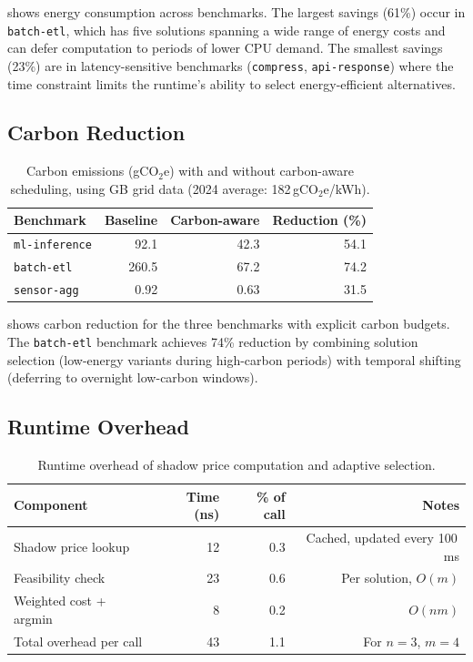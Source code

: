 \documentclass[11pt,a4paper]{article}
\begin{document}
 shows energy consumption across benchmarks.  The largest
savings (61\%) occur in \texttt{batch-etl}, which has five solutions spanning
a wide range of energy costs and can defer computation to periods of lower CPU
demand.  The smallest savings (23\%) are in latency-sensitive benchmarks
(\texttt{compress}, \texttt{api-response}) where the time constraint limits
the runtime's ability to select energy-efficient alternatives.

\subsection{Carbon Reduction}

\begin{table}[t]
\centering
\caption{Carbon emissions (gCO$_2$e) with and without carbon-aware scheduling,
using GB grid data (2024 average: 182\,gCO$_2$e/kWh).}
\label{tab:carbon}
\begin{tabular}{lrrr}
\toprule
Benchmark & Baseline & Carbon-aware & Reduction (\%) \\
\midrule
\texttt{ml-inference} & 92.1 & 42.3 & 54.1 \\
\texttt{batch-etl}    & 260.5 & 67.2 & 74.2 \\
\texttt{sensor-agg}   & 0.92 & 0.63 & 31.5 \\
\bottomrule
\end{tabular}
\end{table}

 shows carbon reduction for the three benchmarks with
explicit carbon budgets.  The \texttt{batch-etl} benchmark achieves 74\%
reduction by combining solution selection (low-energy variants during
high-carbon periods) with temporal shifting (deferring to overnight
low-carbon windows).

\subsection{Runtime Overhead}

\begin{table}[t]
\centering
\caption{Runtime overhead of shadow price computation and adaptive selection.}
\label{tab:overhead}
\begin{tabular}{lrrr}
\toprule
Component & Time (ns) & \% of call & Notes \\
\midrule
Shadow price lookup     & 12  & 0.3 & Cached, updated every 100\,ms \\
Feasibility check       & 23  & 0.6 & Per solution, $O(m)$ \\
Weighted cost + argmin  & 8   & 0.2 & $O(nm)$ \\
Total overhead per call & 43  & 1.1 & For $n=3$, $m=4$ \\
\bottomrule
\end{tabular}
\end{table}
\end{document}
